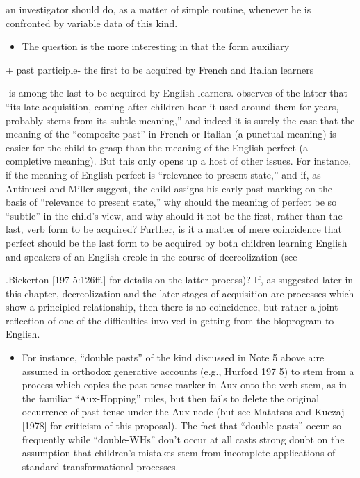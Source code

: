 
an investigator should do, as a matter of simple routine, whenever he is confronted by variable data of this kind.

\begin{itemize}
\item The question is the more interesting in that the form auxiliary
\end{itemize}

+ past participle- the first to be acquired by French and Italian learners

{}-is among the last to be acquired by English learners. \citet{Maratsos1979} observes of the latter that ``its late acquisition, coming after children hear it used around them for years, probably stems from its subtle meaning,'' and indeed it is surely the case that the meaning of the ``composite past'' in French or Italian (a punctual meaning) is easier for the child to grasp than the meaning of the English perfect (a com\-pletive meaning). But this only opens up a host of other issues. For instance, if the meaning of English perfect is ``relevance to present state,'' and if, as Antinucci and Miller suggest, the child assigns his early past marking on the basis of ``relevance to present state,'' why should the meaning of perfect be so ``subtle'' in the child's view, and why should it not be the first, rather than the last, verb form to be acquired? Further, is it a matter of mere coincidence that perfect should be the last form to be acquired by both children learning English and speakers of an English creole in the course of decreolization (see

.Bickerton [197 5:126ff.] for details on the latter process)? If, as suggested later in this chapter, decreolization and the later stages of acquisition are processes which show a principled relationship, then there is no coincidence, but rather a joint reflection of one of the difficulties involved in getting from the bioprogram to English.

\begin{itemize}
\item For instance, ``double pasts'' of the kind discussed in Note 5 above a:re assumed in orthodox generative accounts (e.g., Hurford 197 5) to stem from a process which copies the past-tense marker in Aux onto the verb-stem, as in the familiar ``Aux-Hopping'' rules, but then fails to delete the original occurrence of past tense under the Aux node (but see Matatsos and Kuczaj [1978] for criticism of this proposal). The fact that ``double pasts'' occur so frequently while ``double-WHs'' don't occur at all casts strong doubt on the assumption that children's mistakes stem from incomplete applications of standard transformational processes.
\end{itemize}

